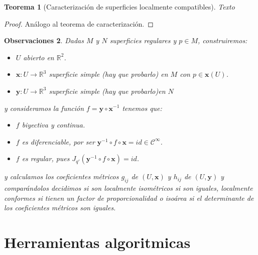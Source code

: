 \documentclass[a4paper,10pt]{book}
\newtheorem{thm}{Teorema}[chapter]
\newtheorem{rem}[thm]{Observaciones}
\newcommand{\UX}{(U,\textbf{x})}
\begin{document}
\begin{thm}[Caracterización de superficies localmente compatibles]
Texto
\end{thm}
\begin{proof}
Análogo al teorema de caracterización.
\end{proof}

\begin{rem}
Dadas $M$ y $N$ superficies regulares y $p\in M$, construiremos:
\begin{itemize}
\item $U$ abierto en $\mathbb{R}^2$.
\item $\mathbf{x}:U\to \mathbb{R}^3$ superficie simple (hay que probarlo) en $M$ con $p\in \mathbf{x}(U)$.
\item $\mathbf{y}:U\to \mathbb{R}^3$ superficie simple (hay que probarlo)en $N$
\end{itemize}
y consideramos la función $f=\mathbf{y}\circ \mathbf{x}^{-1}$ tenemos que:
\begin{itemize}
\item $f$ biyectiva y continua.
\item $f$ es diferenciable, por ser $\mathbf{y}^{-1}\circ f\circ  \mathbf{x}=id\in \mathcal{C}^\infty$.
\item $f$ es regular, pues $J_{q'}(\mathbf{y}^{-1}\circ f\circ  \mathbf{x})=id$.
\end{itemize}
y calculamos los coeficientes métricos $g_{ij}$ de $\UX$ y $h_{ij}$ de $(U,\mathbf{y})$ y comparándolos decidimos si son localmente isométricos si son iguales, localmente conformes si tienen un factor de proporcionalidad o isoárea si el determinante de los coeficientes métricos son iguales.
\end{rem}

\chapter{Herramientas algoritmicas}
\end{document}
